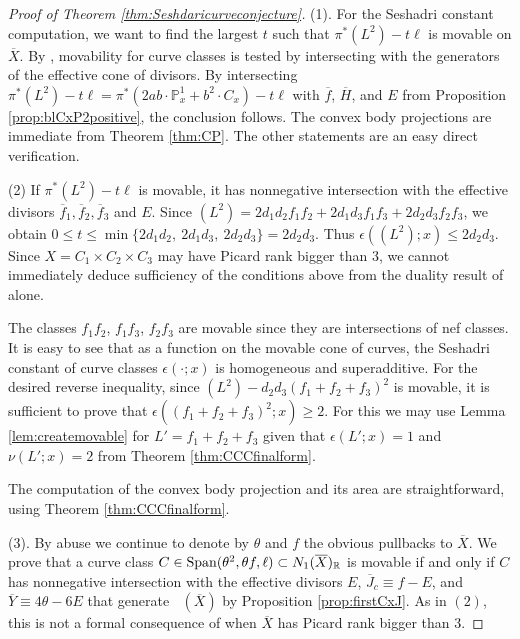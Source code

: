 \documentclass[12pt]{amsart}
\theoremstyle{definition}
\newcommand{\bb}{\ensuremath{\mathfrak{b}}}
\renewcommand{\geq}{\geqslant}
\renewcommand{\leq}{\leqslant}
\DeclareMathOperator{\Eff}{\overline{Eff}}
\newcommand{\?}{ \circled{{\large\bf ?}}}
\let\bb\mathbb
\begin{document}
\begin{proof}[Proof of {Theorem \ref{thm:Seshdaricurveconjecture}}]
	(1). For the Seshadri constant computation, we want to find the largest $t$ such that $\pi^*(L^2)-t\ell$ is movable on $\overline X$. By \cite{BDPP}, movability for curve classes is tested by intersecting with the generators of the effective cone of divisors. By intersecting $\pi^*(L^2)-t\ell=\pi^*(2ab\cdot\bb P^1_x+b^2\cdot C_x)-t\ell$ with $\overline f$, $\overline H$, and $E$ from Proposition \ref{prop:blCxP2positive}, the conclusion follows. 
	The convex body projections are immediate from Theorem \ref{thm:CP}. The other statements are an easy direct verification.
	\smallskip
	
	(2) If $\pi^*(L^2)-t\ell$ is movable, it has nonnegative intersection with the effective divisors $\overline f_1,\overline f_2,\overline f_3$ and $E$. Since $(L^2)=2d_1d_2f_1f_2+2d_1d_3f_1f_3+2d_2d_3f_2f_3$, we obtain $0\leq t\leq\min\{2d_1d_2,\ 2d_1d_3,\ 2d_2d_3\}=2d_2d_3$. Thus $\epsilon((L^2);x)\leq 2d_2d_3$.
	Since $X=C_1\times C_2\times C_3$ may have Picard rank bigger than $3$, we cannot immediately deduce sufficiency of the conditions above from the duality result of \cite{BDPP} alone.
	
	The classes $f_1f_2$, $f_1f_3$, $f_2f_3$ are movable since they are intersections of nef classes. It is easy to see that as a function on the movable cone of curves, the Seshadri constant of curve classes $\epsilon(\cdot;x)$ is homogeneous and superadditive. For the desired reverse inequality, since $(L^2)-d_2d_3(f_1+f_2+f_3)^2$ is movable, it is sufficient to prove that $\epsilon((f_1+f_2+f_3)^2;x)\geq 2$. For this we may use Lemma \ref{lem:createmovable} for $L'=f_1+f_2+f_3$ given that
	$\epsilon(L';x)=1$ and $\nu(L';x)=2$ from Theorem \ref{thm:CCCfinalform}.
	
	The computation of the convex body projection and its area are straightforward, using Theorem \ref{thm:CCCfinalform}.
\smallskip

(3). 	By abuse we continue to denote by $\theta$ and $f$ the obvious pullbacks to $\overline X$. 
We prove that a curve class $C\in{\rm Span}(\theta^2,\theta f,\ell)\subset N_1(\overline X)_{\bb R}$ is movable if and only if $C$ has nonnegative intersection with the effective divisors $E$, $\overline J_c\equiv f-E$, and $\overline Y\equiv 4\theta-6E$ that generate $\Eff(\overline X)$ by Proposition \ref{prop:firstCxJ}. As in $(2)$, this is not a formal consequence of \cite{BDPP} when $\overline X$ has Picard rank bigger than 3. 


\end{proof}
\end{document}
